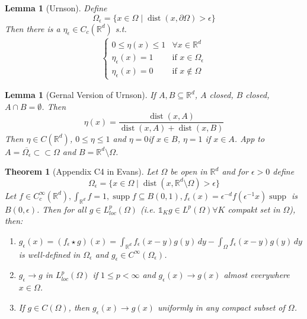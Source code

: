 \documentclass{report}
\theoremstyle{tommy}
\newtheorem{thm}[defn]{Theorem}
\newtheorem{lem}[defn]{Lemma}
\newcommand{\dist}{\operatorname{dist}}
\newcommand{\supp}{\operatorname{supp}}
\begin{document}
  \begin{lem}[Urnson]
    Define 
    \[\Omega_\epsilon = \{x \in \Omega \mid \dist(x, \partial \Omega) > \epsilon\}\]
    Then there is a \(\eta_\epsilon \in C_c(\mathbb{R}^d)\) s.t.
    \begin{align*}
      \begin{cases}
        0 \le \eta(x) \le 1 & \forall x \in \mathbb{R}^d \\
        \eta_\epsilon(x) = 1 & \text{if } x \in \Omega_\epsilon \\
        \eta_\epsilon(x) = 0 & \text{if } x \notin \Omega
      \end{cases}
    \end{align*}
  \end{lem}

  \begin{lem}[Gernal Version of Urnson]
    If \(A, B \subseteq \mathbb{R}^d\), \(A\) closed, \(B\) closed, \(A \cap B = \emptyset\). Then
    \[\eta(x) = \frac{\dist(x, A)}{\dist(x, A) + \dist(x, B)}\]
    Then \(\eta \in C(\mathbb{R}^d)\), \(0 \le \eta \le 1\) and \(\eta = 0\)if \(x \in B\), \(\eta = 1\) if \(x \in A\). App to \(A = \overline{\Omega_\epsilon} \subset \subset \Omega\) and \(B = \mathbb{R}^d \setminus \Omega\).
  \end{lem}

  
  \begin{thm}[Appendix C4 in Evans]
    Let \(\Omega\) be open in \(\mathbb{R}^d\) and for \(\epsilon > 0\) define
    \[\Omega_\epsilon = \{x \in \Omega \mid \dist(x, \mathbb{R}^d \setminus \Omega) > \epsilon\}\]
    Let \(f \in C_c^\infty(\mathbb{R}^d), \int_{\mathbb{R}^d} f = 1, \supp f \subseteq B(0, 1), f_\epsilon(x) = \epsilon^{-d} f(\epsilon^{-1} x) \supp\) is \(B(0, \epsilon)\). Then for all \(g \in L_{loc}^p(\Omega)\) (i.e. \(\mathbb{1}_K g \in L^p(\Omega) \forall K\) compakt set in \(\Omega\)), then:
    \begin{enumerate}[label=\alph*)]
      \item \(g_\epsilon(x) = (f_\epsilon \star g)(x) = \int_{\mathbb{R}^d} f_\epsilon(x-y) g(y) \, dy - \int_\Omega f_\epsilon(x-y) g(y) \, dy\) is well-defined in \(\Omega_\epsilon\) and \(g_\epsilon \in C^\infty(\Omega_\epsilon)\).
      \item \(g_\epsilon \to g\) in \(L_{loc}^p(\Omega)\) if \(1 \le p < \infty\) and \(g_\epsilon(x) \to g(x)\) almost everywhere \(x \in \Omega\).
      \item If \(g \in C(\Omega)\), then \(g_\epsilon(x) \to g(x)\) uniformly in any compact subset of \(\Omega\).
    \end{enumerate}
  \end{thm}
\end{document}
